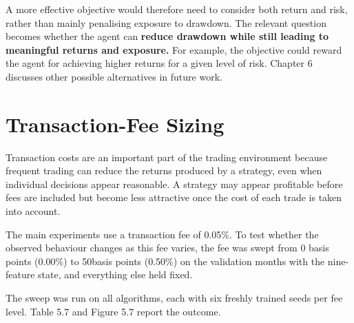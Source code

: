 A more effective objective would therefore need to consider both return
and risk, rather than mainly penalising exposure to drawdown. The
relevant question becomes whether the agent can \textbf{reduce drawdown
while still leading to meaningful returns and exposure.} For example,
the objective could reward the agent for achieving higher returns for a
given level of risk. Chapter 6 discusses other possible alternatives in
future work.

\section{Transaction-Fee Sizing}

Transaction costs are an important part of the trading environment
because frequent trading can reduce the returns produced by a strategy,
even when individual decisions appear reasonable. A strategy may appear
profitable before fees are included but become less attractive once the
cost of each trade is taken into account.

The main experiments use a transaction fee of 0.05\%. To test whether
the observed behaviour changes as this fee varies, the fee was swept
from 0 basis points (0.00\%) to 50basis points (0.50\%) on the
validation months with the nine-feature state, and everything else held
fixed.

The sweep was run on all algorithms, each with six freshly trained seeds
per fee level. Table 5.7 and Figure 5.7 report the outcome.

